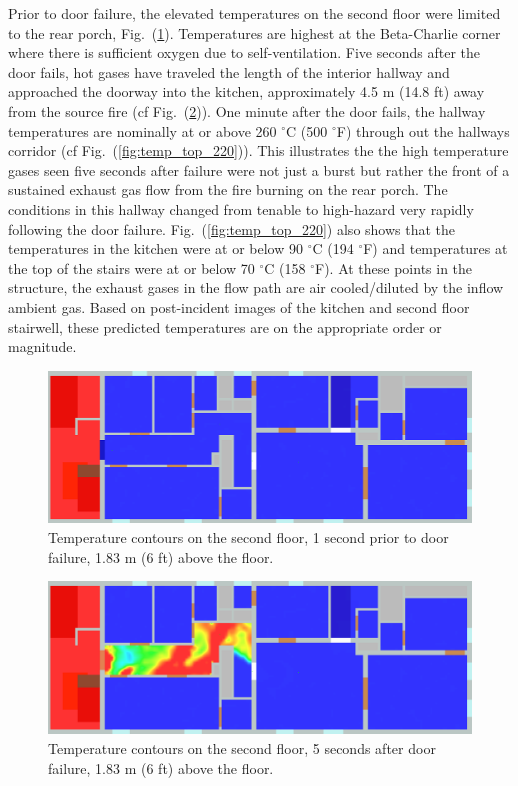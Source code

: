 \documentclass[11pt,oneside]{book}
\begin{document}
Prior to door failure, the elevated temperatures on the second floor were limited to the rear porch, Fig.~(\ref{fig:temp_top_159}). Temperatures are highest at the Beta-Charlie corner where there is sufficient oxygen due to self-ventilation. Five seconds after the door fails, hot gases have traveled the length of the interior hallway and approached the doorway into the kitchen, approximately 4.5 m (14.8 ft) away from the source fire (cf Fig.~(\ref{fig:temp_top_165})). One minute after the door fails, the hallway temperatures are nominally at or above 260 $^{\circ}$C (500 $^{\circ}$F) through out the hallways corridor (cf Fig.~(\ref{fig:temp_top_220})). This illustrates the the high temperature gases seen five seconds after failure were not just a burst but rather the front of a sustained exhaust gas flow from the fire burning on the rear porch. The conditions in this hallway changed from tenable to high-hazard very rapidly following the door failure. Fig.~(\ref{fig:temp_top_220}) also shows that the temperatures in the kitchen were at or below 90 $^{\circ}$C (194 $^{\circ}$F) and temperatures at the top of the stairs were at or below 70 $^{\circ}$C (158 $^{\circ}$F). At these points in the structure, the exhaust gases in the flow path are air cooled/diluted by the inflow ambient gas. Based on post-incident images of the kitchen and second floor stairwell, these predicted temperatures are on the appropriate order or magnitude.

\begin{figure}[h!]
\centering
\includegraphics[width=.7\textwidth]{../Figures/west_50th_baseline_top_159_6ft}
 

\caption{Temperature contours on the second floor, 1 second prior to door failure, 1.83 m (6 ft) above the floor.}
\label{fig:temp_top_159}
\end{figure}

\begin{figure}[h!]
\centering
\includegraphics[width=.7\textwidth]{../Figures/west_50th_baseline_top_165_6ft}
 

\caption{Temperature contours on the second floor, 5 seconds after door failure, 1.83 m (6 ft) above the floor.}
\label{fig:temp_top_165}
\end{figure}
\end{document}
